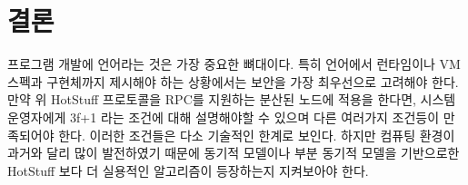 \documentclass[table,smallextended]{svjour3}       %
\begin{document}
\section{결론}
\label{sec:3}
프로그램 개발에 언어라는 것은 가장 중요한 뼈대이다. 특히 언어에서 런타임이나 VM스펙과 구현체까지 제시해야 하는 
상황에서는 보안을 가장 최우선으로 고려해야 한다. 만약 위 HotStuff 프로토콜을 RPC를 지원하는 분산된 노드에 적용을
한다면, 시스템 운영자에게 3f+1 라는 조건에 대해 설명해야할 수 있으며 다른 여러가지 조건등이 만족되어야 한다. 
이러한 조건들은 다소 기술적인 한계로 보인다. 하지만 컴퓨팅 환경이 과거와 달리 많이 발전하였기 때문에
동기적 모델이나 부분 동기적 모델을 기반으로한 HotStuff 보다 더 실용적인 알고리즘이 등장하는지 지켜보아야 한다.






%
%





%
%
     
\end{document}
